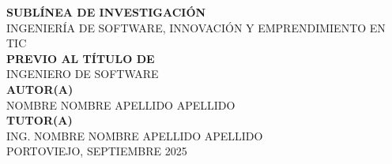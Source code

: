 \begin{titlepage}
\begin{center}
{\fontsize{11pt}{11pt}\selectfont \textbf{SUBLÍNEA DE INVESTIGACIÓN}}\\[-6pt]
{\fontsize{11pt}{11pt}\selectfont INGENIERÍA DE SOFTWARE, INNOVACIÓN Y EMPRENDIMIENTO EN TIC}\\[20pt]

{\fontsize{11pt}{11pt}\selectfont \textbf{PREVIO AL TÍTULO DE}}\\
{\fontsize{15pt}{15pt}\selectfont INGENIERO DE SOFTWARE}\\[10pt]

{\fontsize{13.2pt}{13.2pt}\selectfont \textbf{AUTOR(A)}}\\[-6pt]
{\fontsize{13.2pt}{13.2pt}\selectfont NOMBRE NOMBRE APELLIDO APELLIDO}\\[10pt]



{\fontsize{13pt}{13pt}\selectfont \textbf{TUTOR(A)}}\\[-6pt]
{\fontsize{13pt}{13pt}\selectfont ING. NOMBRE NOMBRE APELLIDO APELLIDO}\\[16pt]



{\fontsize{11pt}{11pt}\selectfont PORTOVIEJO, SEPTIEMBRE 2025}

\end{center}

\end{titlepage}
